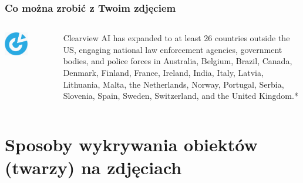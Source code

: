 \documentclass{beamer}
\begin{document}
            \begin{frame}
                \begin{center}
                    \frametitle{Co można zrobić z Twoim zdjęciem}
                    \begin{columns}
                        \begin{column}{0.5\textwidth}
                            \begin{center}
                                \includegraphics[width=0.5\textwidth]{pictures/clearview_ai.png}
                            \end{center}
                        \end{column}
                        \begin{column}{0.5\textwidth}
                            Clearview AI has expanded to at least 26 countries outside the US, engaging national law enforcement agencies, government bodies, and police forces in Australia, Belgium, Brazil, Canada, Denmark, Finland, France, Ireland, India, Italy, Latvia, Lithuania, Malta, the Netherlands, Norway, Portugal, Serbia, Slovenia, Spain, Sweden, Switzerland, and the United Kingdom.*
                        \end{column}
                    \end{columns}
                \end{center}
            \end{frame}

    \section{Sposoby wykrywania obiektów (twarzy) na zdjęciach}
        
\end{document}
